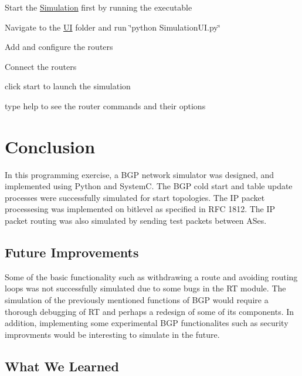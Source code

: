 \begin{DoxyEnumerate}
\item Start the \hyperlink{classSimulation}{Simulation} first by running the executable
\item Navigate to the \hyperlink{namespaceUI}{U\-I} folder and run \char`\"{}python Simulation\-U\-I.\-py\char`\"{}
\item Add and configure the routers
\item Connect the routers
\item click start to launch the simulation
\item type help to see the router commands and their options
\end{DoxyEnumerate}\hypertarget{index_s_conclusion}{}\section{Conclusion}\label{index_s_conclusion}
In this programming exercise, a B\-G\-P network simulator was designed, and implemented using Python and System\-C. The B\-G\-P cold start and table update processes were successfully simulated for start topologies. The I\-P packet processesing was implemented on bitlevel as specified in R\-F\-C 1812. The I\-P packet routing was also simulated by sending test packets between A\-Ses. \hypertarget{index_sub_futureImprovements}{}\subsection{Future Improvements}\label{index_sub_futureImprovements}
Some of the basic functionality such as withdrawing a route and avoiding routing loops was not successfully simulated due to some bugs in the R\-T module. The simulation of the previously mentioned functions of B\-G\-P would require a thorough debugging of R\-T and perhaps a redesign of some of its components. In addition, implementing some experimental B\-G\-P functionalites such as security improvments would be interesting to simulate in the future. \hypertarget{index_sub_whatwelearned}{}\subsection{What We Learned}\label{index_sub_whatwelearned}
